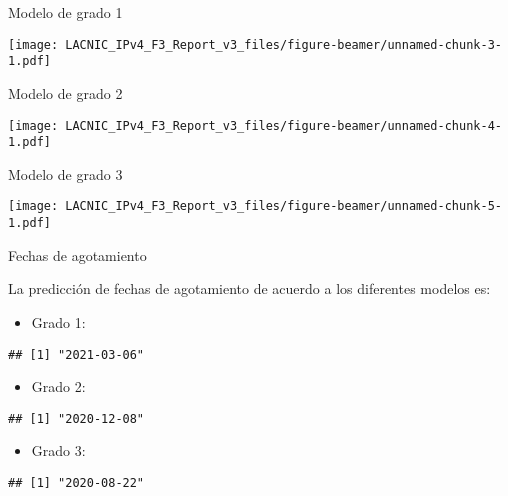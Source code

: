 \documentclass[ignorenonframetext,]{beamer}
\providecommand{\tightlist}{%
  \setlength{\itemsep}{0pt}\setlength{\parskip}{0pt}}
\begin{document}
\begin{frame}{Modelo de grado 1}
\protect\hypertarget{modelo-de-grado-1}{}

\texttt{[image: LACNIC\_IPv4\_F3\_Report\_v3\_files/figure-beamer/unnamed-chunk-3-1.pdf]}

\end{frame}

\begin{frame}{Modelo de grado 2}
\protect\hypertarget{modelo-de-grado-2}{}

\texttt{[image: LACNIC\_IPv4\_F3\_Report\_v3\_files/figure-beamer/unnamed-chunk-4-1.pdf]}

\end{frame}

\begin{frame}{Modelo de grado 3}
\protect\hypertarget{modelo-de-grado-3}{}

\texttt{[image: LACNIC\_IPv4\_F3\_Report\_v3\_files/figure-beamer/unnamed-chunk-5-1.pdf]}

\end{frame}

\begin{frame}[fragile]{Fechas de agotamiento}
\protect\hypertarget{fechas-de-agotamiento}{}

La predicción de fechas de agotamiento de acuerdo a los diferentes
modelos es:

\begin{itemize}
\tightlist
\item
  Grado 1:
\end{itemize}

\begin{verbatim}
## [1] "2021-03-06"
\end{verbatim}

\begin{itemize}
\tightlist
\item
  Grado 2:
\end{itemize}

\begin{verbatim}
## [1] "2020-12-08"
\end{verbatim}

\begin{itemize}
\tightlist
\item
  Grado 3:
\end{itemize}

\begin{verbatim}
## [1] "2020-08-22"
\end{verbatim}

\end{frame}
\end{document}
